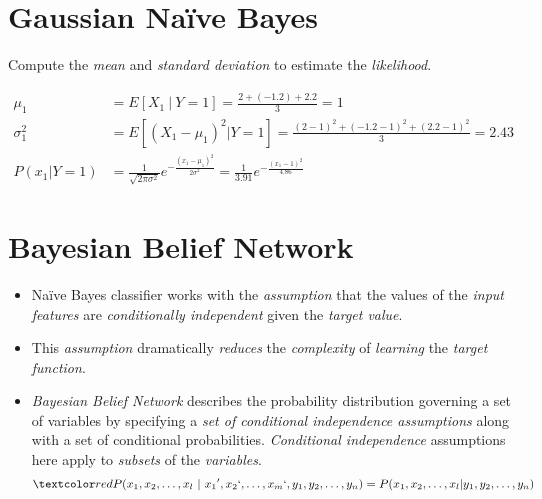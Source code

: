 \documentclass[
	title={Naïve Bayes Learning}
]{cs584notes}
\begin{document}

\tableofcontents

\section{Gaussian Naïve Bayes}\label{sec:gaussian-naive-bayes}
Compute the \emph{mean} and \emph{standard deviation} to estimate the \emph{likelihood}.

\begin{equation*}
\begin{aligned}
	\mu_{1} &= E[X_{1}\ |\ Y = 1] = \frac{2 + (-1.2)  + 2.2}{3} = 1\\
	\sigma_{1}^{2} &= E\left[ (X_{1} - \mu_{1})^{2} | Y = 1 \right] = \frac{(2-1)^{2} + (-1.2 - 1)^{2} + (2.2 - 1)^{2}}{3} = 2.43\\
	P(x_{1} | Y=1 ) &= \frac{1}{\sqrt{2\pi\sigma^{2}}}e^{-\frac{(x_{1} - \mu_{1})^{2}}{2\sigma^{2}}} = \frac{1}{3.91}e^{-\frac{(x_{1} - 1)^{2}}{4.86}}
\end{aligned}
\end{equation*}

\section{Bayesian Belief Network}\label{sec:bayesian-belief-network}
\begin{itemize}
	\item Naïve Bayes classifier works with the \emph{assumption} that the values of the \emph{input features} are \emph{conditionally independent} given the \emph{target value}.
	\item This \emph{assumption} dramatically \emph{reduces} the \emph{complexity} of \emph{learning} the \emph{target function}.
	\item \emph{Bayesian Belief Network} describes the probability distribution governing a set of variables by specifying a \emph{set of conditional independence assumptions} along with a set of conditional probabilities. \emph{Conditional independence} assumptions here apply to \emph{subsets} of the \emph{variables}.
	\[ \data{ P(x_{1}, x_{2}, \dots, x_{l}\ |\ x_{1}{'}, x_{2}{`}, \dots, x_{m}{`}, y_{1}, y_{2}, \dots, y_{n}) = P(x_{1}, x_{2}, \dots, x_{l} | y_{1}, y_{2}, \dots, y_{n}) } \]
\end{itemize}
\end{document}
